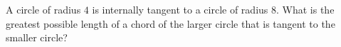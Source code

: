 A circle of radius $4$ is internally tangent to a circle of radius $8$. What is the greatest possible length of a chord of the larger circle that is tangent to the smaller circle?
